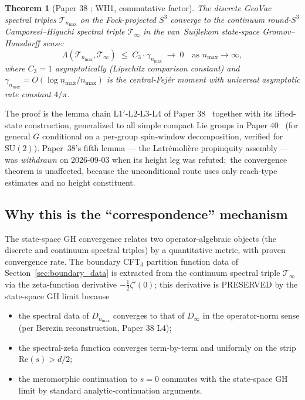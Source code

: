 \documentclass[11pt,a4paper]{article}
\theoremstyle{plain}
\newtheorem{theorem}{Theorem}[section]
\theoremstyle{definition}
\newcommand{\nmax}{n_{\max}}
\newcommand{\sthree}{S^{3}}
\newcommand{\Tcal}{\mathcal{T}}
\begin{document}
\begin{theorem}[Paper 38 \cite{paper38}; WH1, commutative factor]
\label{thm:propinquity}
The discrete GeoVac spectral triples $\Tcal_{\nmax}$ on the
Fock-projected $\sthree$ converge to the continuum round-$\sthree$
Camporesi--Higuchi spectral triple $\Tcal_{\infty}$ in the
van~Suijlekom state-space Gromov--Hausdorff sense:
\begin{equation}
\Lambda(\Tcal_{\nmax}, \Tcal_{\infty})
\;\le\; C_{3} \cdot \gamma_{\nmax}
\;\to\; 0 \quad \text{as } \nmax \to \infty,
\label{eq:propinquity_rate}
\end{equation}
where $C_{3} = 1$ asymptotically (Lipschitz comparison constant) and
$\gamma_{\nmax} = O(\log \nmax / \nmax)$ is the central-Fej\'er
moment with universal asymptotic rate constant $4/\pi$.
\end{theorem}

The proof is the lemma chain $\mathrm{L1}'$-$\mathrm{L2}$-$\mathrm{L3}$-$\mathrm{L4}$
of Paper 38~\cite{paper38} together with its lifted-state construction,
generalized to all simple compact Lie groups in Paper 40~\cite{paper40} (for
general $G$ conditional on a per-group spin-window decomposition, verified for
$\mathrm{SU}(2)$).  Paper~38's fifth lemma --- the Latr\'emoli\`ere
propinquity assembly --- was \emph{withdrawn} on 2026-09-03 when its height leg
was refuted;\ the convergence theorem is unaffected, because the unconditional
route uses only reach-type estimates and no height constituent.

\subsection{Why this is the ``correspondence'' mechanism}

The state-space GH convergence relates two operator-algebraic objects
(the discrete and continuum spectral triples) by a quantitative
metric, with proven convergence rate. The boundary CFT$_{3}$
partition function data of Section~\ref{sec:boundary_data} is
extracted from the continuum spectral triple $\Tcal_{\infty}$ via the
zeta-function derivative $-\tfrac{1}{2}\zeta'(0)$; this derivative is
PRESERVED by the state-space GH limit because
\begin{itemize}
\item the spectral data of $D_{\nmax}$ converges to that of
$D_{\infty}$ in the operator-norm sense (per Berezin reconstruction,
Paper 38 L4);
\item the spectral-zeta function converges term-by-term and uniformly
on the strip $\mathrm{Re}(s) > d/2$;
\item the meromorphic continuation to $s = 0$ commutes with the
state-space GH limit by standard analytic-continuation arguments.
\end{itemize}
\end{document}
